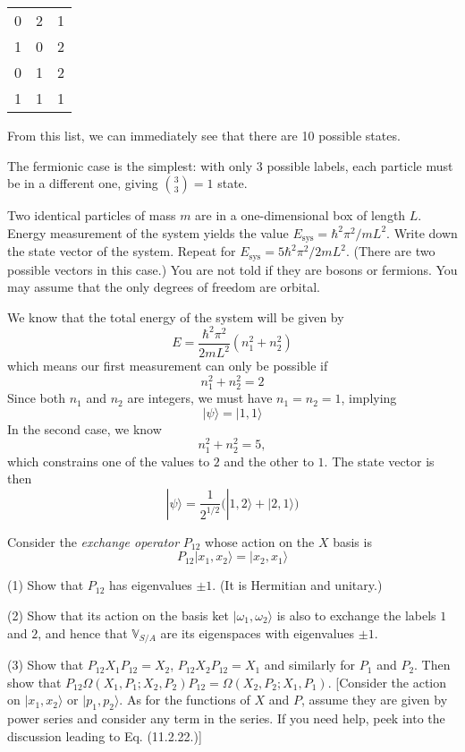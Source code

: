 \documentclass[../principles-of-quantum-mechanics.tex]{subfiles}
\begin{document}
\begin{questions}
\begin{solution}
\begin{center}
\begin{tabular}{c|c|c}
					0 & 2 & 1 \\
	
					1 & 0 & 2 \\
	
					0 & 1 & 2 \\
	
					1 & 1 & 1
	
				\end{tabular}
			\end{center}
			From this list, we can immediately see that there are 10 possible states.
			
			The fermionic case is the simplest: with only 3 possible labels, each particle must be in a different one, giving ${3\choose3}=1$ state.
		\end{solution}
		
		\question Two identical particles of mass $m$ are in a one-dimensional box of length $L$. Energy measurement of the system yields the value $E_\text{sys} = \hbar^2\pi^2/mL^2$. Write down the state vector of the system. Repeat for $E_\text{sys} = 5\hbar^2\pi^2/2mL^2$. (There are two possible vectors in this case.) You are not told if they are bosons or fermions. You may assume that the only degrees of freedom are orbital.
		
		\begin{solution}
			We know that the total energy of the system will be given by
			$$E = \frac{\hbar^2\pi^2}{2mL^2}(n_1^2 + n_2^2)$$
			which means our first measurement can only be possible if
			$$n_1^2 + n_2^2 = 2$$
			Since both $n_1$ and $n_2$ are integers, we must have $n_1 = n_2 = 1$, implying
			$$|\psi\rangle = |1, 1\rangle$$
			In the second case, we know
			$$n_1^2 + n_2^2 = 5,$$
			which constrains one of the values to $2$ and the other to $1$. The state vector is then
			$$|\psi\rangle = \frac{1}{2^{1/2}}\big(|1, 2\rangle + |2, 1\rangle\big)$$
		\end{solution}
		
		\question Consider the \textit{exchange operator} $P_{12}$ whose action on the $X$ basis is
		$$P_{12}|x_1,x_2\rangle = |x_2,x_1\rangle$$
		
		(1) Show that $P_{12}$ has eigenvalues $\pm 1$. (It is Hermitian and unitary.)
		
		(2) Show that its action on the basis ket $|\omega_1, \omega_2\rangle$ is also to exchange the labels $1$ and $2$, and hence that $\mathbb{V}_{S/A}$ are its eigenspaces with eigenvalues $\pm1$.
		
		(3) Show that $P_{12}X_1P_{12}=X_2$, $P_{12}X_2P_{12}=X_1$ and similarly for $P_1$ and $P_2$. Then show that $P_{12}\Omega(X_1, P_1; X_2, P_2)P_{12} = \Omega(X_2, P_2;X_1, P_1)$. [Consider the action on $|x_1, x_2\rangle$ or $|p_1, p_2\rangle$. As for the functions of $X$ and $P$, assume they are given by power series and consider any term in the series. If you need help, peek into the discussion leading to Eq. (11.2.22.)]
		

\end{questions}
\end{document}
